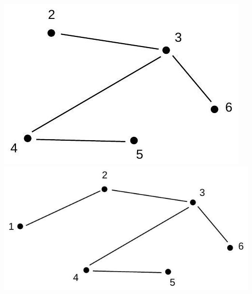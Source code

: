 \documentclass[10pt]{article}
\begin{document}
\includegraphics[max width=\textwidth, center]{2025_09_05_93c7c1835f249f70c0eeg-26}\\
\includegraphics[max width=\textwidth, center]{2025_09_05_93c7c1835f249f70c0eeg-26(3)}
\end{document}
